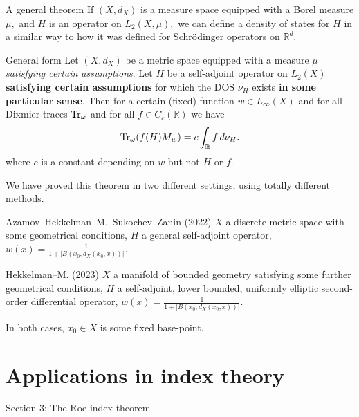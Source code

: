 \documentclass{beamer}
\numberwithin{equation}{section}
\theoremstyle{plain}
\theoremstyle{plain}
\theoremstyle{definition}
\theoremstyle{plain}
\theoremstyle{plain}
\theoremstyle{definition}
\newcommand{\tr}{{\rm Tr}}
\newcommand{\Rl}{\mathbb{R}}
\begin{document}
\begin{frame}{A general theorem}
    If $(X,d_X)$ is a measure space equipped with a Borel measure $\mu,$ and $H$ is an operator on $L_2(X,\mu),$ we can define a density of states for $H$ in a similar way to how it was defined for Schr\"odinger operators on $\Rl^d.$
        
    \begin{block}{General form}
    Let $(X, d_X)$ be a metric space equipped with a measure $\mu$ \emph{satisfying certain assumptions}. Let $H$ be a self-adjoint operator on $L_2(X)$ \textbf{satisfying certain assumptions} for which the DOS $\nu_H$ exists \textbf{in some particular sense}. Then for a certain (fixed) function $w\in L_\infty(X)$ and for all Dixmier traces $\tr_\omega$ and for all $f \in C_c(\mathbb{R})$ we have
    \begin{equation*}\label{F: DOS integral}
        \tr_\omega(f(H)M_w) = c\int_{\mathbb{R}} f\,d\nu_H.
    \end{equation*}
    where $c$ is a constant depending on $w$ but not $H$ or $f.$
    \end{block}
\end{frame}




\begin{frame}
We have proved this theorem in two different settings, using totally different methods.

\begin{block}{Azamov--Hekkelman--M.--Sukochev--Zanin (2022)}
$X$ a discrete metric space with some geometrical conditions, $H$ a general self-adjoint operator, $w(x) = \frac{1}{1+|B(x_0, d_X(x_0, x))|}$.
\end{block}

\begin{block}{Hekkelman--M. (2023)}
    $X$ a manifold of bounded geometry satisfying some further geometrical conditions, $H$ a self-adjoint, lower bounded, uniformly elliptic second-order differential operator, $w(x) = \frac{1}{1+|B(x_0, d_X(x_0, x))|}$.
\end{block}
In both cases, $x_0\in X$ is some fixed base-point.
\end{frame}

\section{Applications in index theory}

\begin{frame}
    \huge{Section 3: The Roe index theorem}
\end{frame}
\end{document}
